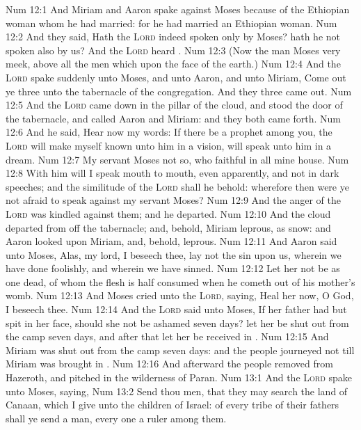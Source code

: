 \vs Num 12:1 And Miriam and Aaron spake against Moses because of the Ethiopian woman whom he had married: for he had married an Ethiopian woman.
\vs Num 12:2 And they said, Hath the \textsc{Lord} indeed spoken only by Moses? hath he not spoken also by us? And the \textsc{Lord} heard .
\vs Num 12:3 (Now the man Moses  very meek, above all the men which  upon the face of the earth.)
\vs Num 12:4 And the \textsc{Lord} spake suddenly unto Moses, and unto Aaron, and unto Miriam, Come out ye three unto the tabernacle of the congregation. And they three came out.
\vs Num 12:5 And the \textsc{Lord} came down in the pillar of the cloud, and stood  the door of the tabernacle, and called Aaron and Miriam: and they both came forth.
\vs Num 12:6 And he said, Hear now my words: If there be a prophet among you,  the \textsc{Lord} will make myself known unto him in a vision,  will speak unto him in a dream.
\vs Num 12:7 My servant Moses  not so, who  faithful in all mine house.
\vs Num 12:8 With him will I speak mouth to mouth, even apparently, and not in dark speeches; and the similitude of the \textsc{Lord} shall he behold: wherefore then were ye not afraid to speak against my servant Moses?
\vs Num 12:9 And the anger of the \textsc{Lord} was kindled against them; and he departed.
\vs Num 12:10 And the cloud departed from off the tabernacle; and, behold, Miriam  leprous,  as snow: and Aaron looked upon Miriam, and, behold,  leprous.
\vs Num 12:11 And Aaron said unto Moses, Alas, my lord, I beseech thee, lay not the sin upon us, wherein we have done foolishly, and wherein we have sinned.
\vs Num 12:12 Let her not be as one dead, of whom the flesh is half consumed when he cometh out of his mother's womb.
\vs Num 12:13 And Moses cried unto the \textsc{Lord}, saying, Heal her now, O God, I beseech thee.
\vs Num 12:14 And the \textsc{Lord} said unto Moses, If her father had but spit in her face, should she not be ashamed seven days? let her be shut out from the camp seven days, and after that let her be received in .
\vs Num 12:15 And Miriam was shut out from the camp seven days: and the people journeyed not till Miriam was brought in .
\vs Num 12:16 And afterward the people removed from Hazeroth, and pitched in the wilderness of Paran.
\vs Num 13:1 And the \textsc{Lord} spake unto Moses, saying,
\vs Num 13:2 Send thou men, that they may search the land of Canaan, which I give unto the children of Israel: of every tribe of their fathers shall ye send a man, every one a ruler among them.
